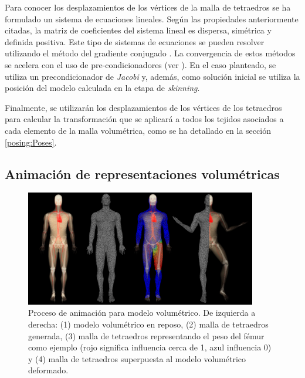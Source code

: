 Para conocer los desplazamientos de los vértices de la malla de tetraedros se ha formulado un sistema de ecuaciones lineales. Según las propiedades anteriormente citadas, la matriz de coeficientes del sistema lineal es dispersa, simétrica y definida positiva. Este tipo de sistemas de ecuaciones se pueden resolver utilizando el método del gradiente conjugado \cite{Press2007}. La convergencia de estos métodos se acelera con el uso de pre-condicionadores (ver \cite{hauth2003}). En el caso planteado, se utiliza un precondicionador de \emph{Jacobi} y, además, como solución inicial se utiliza la posición del modelo calculada en la etapa de \emph{skinning}. %

Finalmente, se utilizarán los desplazamientos de los vértices de los tetraedros para calcular la transformación que se aplicará a todos los tejidos asociados a cada elemento de la malla volumétrica, como se ha detallado en la sección \ref{posing:Poses}.%

\subsection{Animación de representaciones volumétricas}
\label{posing:animvol}

\begin{figure}[!ht]%
   \centering
   \includegraphics[width=0.90\textwidth]{IMG/Volumetric}
    \caption{Proceso de animación para modelo volumétrico. De izquierda a derecha: (1) modelo volumétrico en reposo, (2) malla de tetraedros generada, (3) malla de tetraedros representando el peso del fémur como ejemplo (rojo significa influencia cerca de 1, azul influencia 0) y (4) malla de tetraedros superpuesta al modelo volumétrico deformado. }
    \label{fig:volEx}
\end{figure}

